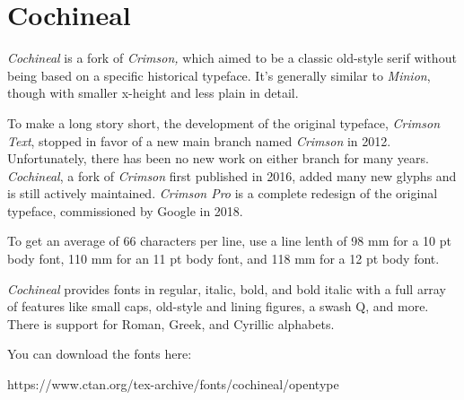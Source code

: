 \switchtobodyfont[cochineal,10pt]
\chapter[cochineal]{Cochineal}

{\it Cochineal} is a fork of {\it Crimson,} which aimed to be a classic old-style serif without being based on a specific historical typeface. It’s generally similar to {\it Minion}, though with smaller x-height and less plain in detail.

To make a long story short, the development of the original typeface, {\it Crimson Text}, stopped in favor of a new main branch named {\it Crimson} in 2012. Unfortunately, there has been no new work on either branch for many years.  {\it Cochineal}, a fork of {\it Crimson} first published in 2016, added many new glyphs and is still actively maintained. {\it Crimson Pro} is a complete redesign of the original typeface, commissioned by Google in 2018.

To get an average of 66 characters per line, use a line lenth of 98 mm for a 10 pt body font, 110 mm for an 11 pt body font, and 118 mm for a 12 pt body font.

{\it Cochineal} provides fonts in regular, italic, bold, and bold italic with a full array of features like small caps, old-style and lining figures, a swash Q, and more. There is support for Roman, Greek, and Cyrillic alphabets.

You can download the fonts here:  

https://www.ctan.org/tex-archive/fonts/cochineal/opentype





